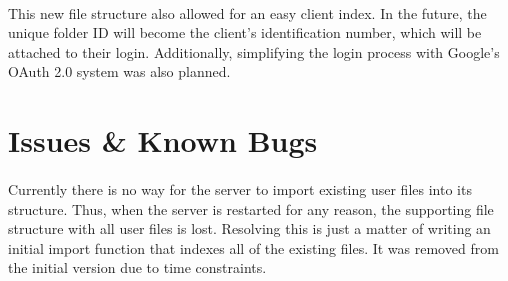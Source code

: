 \paragraph{}
This new file structure also allowed for an easy client index. 
In the future, the unique folder ID will become the client's identification number, which will be attached to their login. 
Additionally, simplifying the login process with Google's OAuth 2.0 system was also planned.

\section{Issues \& Known Bugs}
\paragraph{}
Currently there is no way for the server to import existing user files into its structure.
Thus, when the server is restarted for any reason, the supporting file structure with all user files is lost.
Resolving this is just a matter of writing an initial import function that indexes all of the existing files.
It was removed from the initial version due to time constraints.
